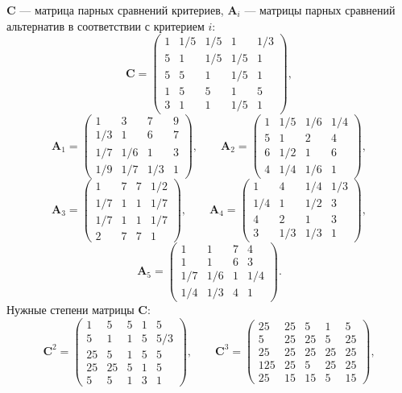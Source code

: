 $\bm{C}$ --- матрица парных сравнений критериев, $\bm{\bm{A}}_i$ --- матрицы парных сравнений альтернатив в соответствии с критерием $i$:
$$\bm{C}= \begin{pmatrix}
1 & 1/5 & 1/5 & 1 & 1/3\\
5 & 1 & 1/5 & 1/5 & 1\\
5 & 5 & 1 & 1/5 & 1\\
1 & 5 & 5 & 1 & 5\\
3 & 1 & 1 & 1/5 & 1
\end{pmatrix},
$$
$$\bm{A}_1= \begin{pmatrix}
1 & 3 & 7 & 9\\
1/3 & 1 & 6 & 7\\
1/7 & 1/6 & 1 & 3\\
1/9 & 1/7 & 1/3 & 1
\end{pmatrix},
\qquad
\bm{A}_2= \begin{pmatrix}
1 & 1/5 & 1/6 & 1/4\\
5 & 1 & 2 & 4\\
6 & 1/2 & 1 & 6\\
4 & 1/4 & 1/6 & 1
\end{pmatrix},
$$
$$\bm{A}_3= \begin{pmatrix}
1 & 7 & 7 & 1/2\\
1/7 & 1 & 1 & 1/7\\
1/7 & 1 & 1 & 1/7\\
2 & 7 & 7 & 1
\end{pmatrix},
\qquad
\bm{A}_4= \begin{pmatrix}
1 & 4 & 1/4 & 1/3\\
1/4 & 1 & 1/2 & 3\\
4 & 2 & 1 & 3\\
3 & 1/3 & 1/3 & 1
\end{pmatrix},
$$
$$\bm{A}_5= \begin{pmatrix}
1 & 1 & 7 & 4\\
1 & 1 & 6 & 3\\
1/7 & 1/6 & 1 & 1/4\\
1/4 & 1/3 & 4 & 1
\end{pmatrix}.
$$
Нужные степени матрицы $\bm{C}$:
$$\bm{C}^2 = \begin{pmatrix}
1 & 5 & 5 & 1 & 5\\
5 & 1 & 1 & 5 & 5/3\\
25 & 5 & 1 & 5 & 5\\
25 & 25 & 5 & 1 & 5\\
5 & 5 & 1 & 3 & 1
\end{pmatrix},
\qquad
\bm{C}^3 = \begin{pmatrix}
25 & 25 & 5 & 1 & 5\\
5 & 25 & 25 & 5 & 25\\
25 & 25 & 25 & 25 & 25\\
125 & 25 & 5 & 25 & 25\\
25 & 15 & 15 & 5 & 15
\end{pmatrix},
$$
